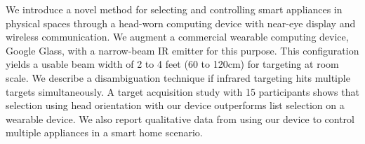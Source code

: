 We introduce a novel method for selecting and controlling smart appliances in physical spaces through a head-worn computing device with near-eye display and wireless communication. We augment a commercial wearable computing device, Google Glass, with a narrow-beam IR emitter for this purpose. This configuration yields a usable beam width of 2 to 4 feet (60 to 120cm) for targeting at room scale. We  describe a disambiguation technique if infrared targeting hits multiple targets simultaneously. A target acquisition study with 15 participants shows that selection using head orientation with our device outperforms list selection on a wearable device. We also report qualitative data from using our device to control multiple appliances in a smart home scenario.